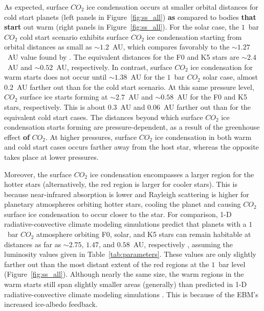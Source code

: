 \documentclass[fleqn,usenatbib]{mnras}
\providecommand{\DIFadd}[1]{{\bf #1}} %
\providecommand{\DIFdel}[1]{} %
\providecommand{\DIFaddbegin}{} %
\providecommand{\DIFaddend}{} %
\providecommand{\DIFdelbegin}{} %
\providecommand{\DIFdelend}{} %
\newcommand{\DIFscaledelfig}{0.5}
\newlength{\DIFdelgraphicswidth} %
\newlength{\DIFdelgraphicsheight} %
\newcommand{\DIFaddincludegraphics}[2][]{{\color{blue}\fbox{\DIFOincludegraphics[#1]{#2}}}} %
\newcommand{\DIFdelincludegraphics}[2][]{%
\sbox{\DIFdelgraphicsbox}{\DIFOincludegraphics[#1]{#2}}%
\settoboxwidth{\DIFdelgraphicswidth}{\DIFdelgraphicsbox} %
\settoboxtotalheight{\DIFdelgraphicsheight}{\DIFdelgraphicsbox} %
\scalebox{\DIFscaledelfig}{%
\parbox[b]{\DIFdelgraphicswidth}{\usebox{\DIFdelgraphicsbox}\\[-\baselineskip] \rule{\DIFdelgraphicswidth}{0em}}\llap{\resizebox{\DIFdelgraphicswidth}{\DIFdelgraphicsheight}{%
\setlength{\unitlength}{\DIFdelgraphicswidth}%
\begin{picture}(1,1)%
\thicklines\linethickness{2pt} %
{\color[rgb]{1,0,0}\put(0,0){\framebox(1,1){}}}%
{\color[rgb]{1,0,0}\put(0,0){\line( 1,1){1}}}%
{\color[rgb]{1,0,0}\put(0,1){\line(1,-1){1}}}%
\end{picture}%
}\hspace*{3pt}}} %
} %
\DeclareRobustCommand{\DIFaddbegin}{\DIFOaddbegin \let\includegraphics\DIFaddincludegraphics} %
\DeclareRobustCommand{\DIFaddend}{\DIFOaddend \let\includegraphics\DIFOincludegraphics} %
\DeclareRobustCommand{\DIFdelbegin}{\DIFOdelbegin \let\includegraphics\DIFdelincludegraphics} %
\DeclareRobustCommand{\DIFdelend}{\DIFOaddend \let\includegraphics\DIFOincludegraphics} %
\begin{document}
As expected, surface $CO_{\mathrm{2}}$ ice condensation occurs at smaller orbital distances for cold start planets (left panels in Figure~\ref{fig:ss_all}) \DIFaddbegin \DIFadd{as }\DIFaddend compared to bodies \DIFdelbegin \DIFdel{starting }\DIFdelend \DIFaddbegin \DIFadd{that start }\DIFaddend out warm (right panels in Figure~\ref{fig:ss_all}).
For the solar case, the $1$~bar $CO_{\mathrm{2}}$ cold start scenario exhibits surface $CO_{\mathrm{2}}$ ice condensation starting from orbital distances as small as $\sim1.2$~AU, which compares favorably to the \DIFdelbegin \DIFdel{$1.27$}\DIFdelend \DIFaddbegin \DIFadd{$\sim 1.27$}\DIFaddend ~AU value found by \citet{Turbet2017}. The equivalent distances for the F0 and K5 stars are $\sim2.4$~AU and $\sim0.52$~AU, respectively.
In contrast, surface $CO_{\mathrm{2}}$ ice condensation for warm starts does not occur until $\sim1.38$~AU for the $1$~bar $CO_{\mathrm{2}}$ solar case, almost  $0.2$~AU farther out than for the cold start scenario. At this same pressure level, $CO_{\mathrm{2}}$ surface ice starts forming at $\sim2.7$~AU and $\sim0.58$~AU for the F0 and K5 stars, respectively. This is about \DIFdelbegin \DIFdel{$0.03$}\DIFdelend \DIFaddbegin \DIFadd{$0.3$}\DIFaddend ~AU and $0.06$~AU farther out than for the equivalent cold start cases.
The distances beyond which surface $CO_{\mathrm{2}}$ ice condensation starts forming are pressure-dependent, as a result of the greenhouse effect \DIFdelbegin \DIFdel{exerted by }\DIFdelend \DIFaddbegin \DIFadd{of }\DIFaddend $CO_{\mathrm{2}}$. At higher pressures, surface $CO_{\mathrm{2}}$ ice condensation in both warm and cold start cases occurs farther away from the host star, whereas the opposite takes place at lower pressures.

Moreover, the surface $CO_{\mathrm{2}}$ ice condensation encompasses a larger region for the hotter stars (alternatively, the red region is larger for cooler stars). This is because near-infrared absorption is lower and Rayleigh scattering is higher for planetary atmospheres orbiting hotter stars, cooling the planet and causing $CO_{\mathrm{2}}$ surface ice condensation to occur closer to the star. For comparison, 1-D radiative-convective climate modeling simulations predict that planets with a $1$~bar $CO_{\mathrm{2}}$ atmosphere orbiting F0, solar, and K5 stars can remain habitable at distances as far as $\sim 2.75$, $1.47$, and $0.58$~AU, respectively \citep{kasting1993, KumarKopparapu2013,Ramirez2018}, assuming the luminosity values given in Table~\ref{tab:parameters}. These values are only slightly farther out than the most distant extent of the red regions at the $1$~bar level (Figure~\ref{fig:ss_all}). Although nearly the same size, the warm regions in the warm starts still span slightly smaller areas (generally) than predicted in 1-D radiative-convective climate modeling simulations \citep{kasting1993, KumarKopparapu2013,Ramirez2018}. This is because of the EBM's increased ice-albedo feedback.
\end{document}
